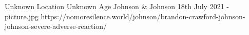 {Unknown Location}
{Unknown Age}
{Johnson \& Johnson }
{18th July 2021}
{-}
{picture.jpg}
{https://nomoresilence.world/johnson/brandon-crawford-johnson-johnson-severe-adverse-reaction/}
{

}
